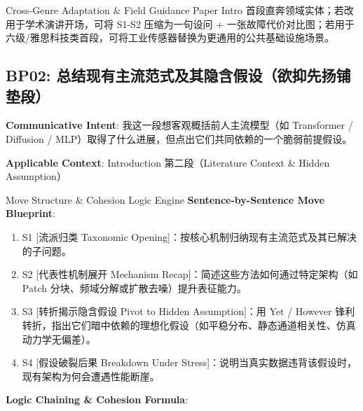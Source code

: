 \endgroup
\vspace{4pt}
\begin{TipBox}{Cross-Genre Adaptation \& Field Guidance}
Paper Intro 首段直奔领域实体；若改用于学术演讲开场，可将 S1-S2 压缩为一句设问 + 一张故障代价对比图；若用于六级/雅思科技类首段，可将工业传感器替换为更通用的公共基础设施场景。
\end{TipBox}
\vspace{8pt}
\subsection{BP02: 总结现有主流范式及其隐含假设（欲抑先扬铺垫段）}\label{sec:bp:BP02}
\noindent\textbf{\color{AcadNavy}Communicative Intent}: 我这一段想客观概括前人主流模型（如 Transformer / Diffusion / MLP）取得了什么进展，但点出它们共同依赖的一个脆弱前提假设。\par\vspace{2pt}
\noindent\textbf{\color{AcadSlate}Applicable Context}: Introduction 第二段（Literature Context \& Hidden Assumption）\par\vspace{4pt}
\begin{ConceptBox}{Move Structure \& Cohesion Logic Engine}
\textbf{Sentence-by-Sentence Move Blueprint}:
\begin{enumerate}[label=\textbf{\color{AcadNavy}S\arabic*.}, leftmargin=2em, itemsep=2pt]
  \item S1 [流派归类 Taxonomic Opening]：按核心机制归纳现有主流范式及其已解决的子问题。
  \item S2 [代表性机制展开 Mechanism Recap]：简述这些方法如何通过特定架构（如 Patch 分块、频域分解或扩散去噪）提升表征能力。
  \item S3 [转折揭示隐含假设 Pivot to Hidden Assumption]：用 Yet / However 锋利转折，指出它们暗中依赖的理想化假设（如平稳分布、静态通道相关性、仿真动力学无偏差）。
  \item S4 [假设破裂后果 Breakdown Under Stress]：说明当真实数据违背该假设时，现有架构为何会遭遇性能断崖。
\end{enumerate}\par\vspace{4pt}
\textbf{Logic Chaining \& Cohesion Formula}:\par{}
\end{ConceptBox}
